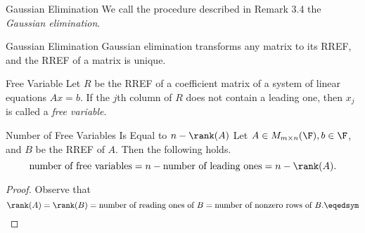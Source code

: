 \documentclass[linearalgebraI]{subfiles}
\begin{document}
    \begin{definition}{Gaussian Elimination}{}
        We call the procedure described in Remark 3.4 the \emph{Gaussian elimination}.
    \end{definition}

    \begin{prop}{Gaussian Elimination}
        Gaussian elimination transforms any matrix to its RREF, and the RREF of a matrix is unique.
    \end{prop}

    \begin{definition}{Free Variable}{}
        Let $R$ be the RREF of a coefficient matrix of a system of linear equations $Ax=b$. If the $j$th column of $R$ does not contain a leading one, then $x_j$ is called a \emph{free variable}.
    \end{definition}

    \begin{prop}{Number of Free Variables Is Equal to $n-\rank(A)$}
        Let $A\in M_{m\times n}(\F), b\in \F$, and $B$ be the RREF of $A$. Then the following holds.
        \begin{equation*}
            \text{number of free variables} = n - \text{number of leading ones} = n - \rank(A). 
        \end{equation*}
    \end{prop}

    \begin{proof}
        Observe that
        \begin{equation*} 
            \rank(A) = \rank(B) = \text{number of reading ones of } B = \text{number of nonzero rows of } B. \eqedsym 
        \end{equation*}
    \end{proof}
\end{document}
